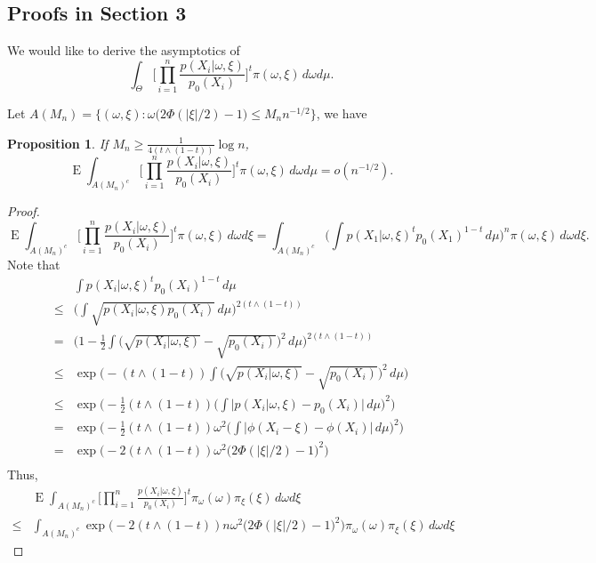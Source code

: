 \documentclass[11pt]{article}
\DeclareMathOperator{\myE}{E}
\theoremstyle{plain}
\newtheorem{proposition}{\quad\quad Proposition}
\theoremstyle{definition}
\theoremstyle{remark}
\begin{document}
\begin{appendices}
\section{Proofs in Section 3}

We would like to derive the asymptotics of
\begin{equation}
    \int_\Theta \Big[\prod_{i=1}^n \frac{p(X_i|\omega,\xi)}{p_0(X_i)}\Big]^t \pi(\omega,\xi)\, d\omega d\mu.
    \label{temp}
\end{equation}

Let $A(M_n)=\{(\omega, \xi): \omega \big( 2\Phi(|\xi|/2)-1\big)\leq M_n n^{-1/2}\}$, we have
\begin{proposition}
    If $M_n \geq  \frac{1}{4(t\wedge (1-t))}\log n$,
    \begin{equation*}
        \myE \int_{A(M_n)^c} \Big[\prod_{i=1}^n \frac{p(X_i|\omega,\xi)}{p_0(X_i)}\Big]^t \pi(\omega,\xi)\, d\omega d\mu =o(n^{-1/2}).
    \end{equation*}
\end{proposition}
\begin{proof}
\begin{equation*}
    \myE \int_{A(M_n)^c} \Big[\prod_{i=1}^n \frac{p(X_i|\omega,\xi)}{p_0(X_i)}\Big]^t \pi(\omega,\xi)\, d\omega d\xi
    =
    \int_{A(M_n)^c} \big( \int p(X_1|\omega,\xi)^t p_0(X_1)^{1-t}\, d\mu\big)^n \pi(\omega,\xi)\, d\omega d\xi.
\end{equation*}
Note that
\begin{align*}
    &\int p(X_i|\omega,\xi)^t p_0(X_i)^{1-t}\, d\mu
    \\
    \leq & \Big(\int \sqrt{p(X_i|\omega,\xi) p_0(X_i)}\, d\mu\Big)^{2(t\wedge (1-t))}
    \\
= & \Big(1-\frac{1}{2}\int \big(\sqrt{p(X_i|\omega,\xi) }-\sqrt{p_0(X_i)}\big)^2\, d\mu\Big)^{2(t\wedge (1-t))}
\\
\leq & \exp \Big( -(t\wedge (1-t))\int \big(\sqrt{p(X_i|\omega,\xi) }-\sqrt{p_0(X_i)}\big)^2\, d\mu \Big)
\\
\leq & \exp \Big( -\frac{1}{2}(t\wedge (1-t)) \big(\int \big| p(X_i|\omega,\xi)-p_0(X_i)\big|\, d\mu \big)^2 \Big)
\\
= & \exp \Big( -\frac{1}{2}(t\wedge (1-t)) \omega^2 \big(\int \big| \phi(X_i -\xi)-\phi (X_i)\big|\, d\mu \big)^2 \Big)
\\
= & \exp \Big( -2(t\wedge (1-t)) \omega^2 \big( 2\Phi(|\xi|/2)-1\big)^2 \Big)
\\
\end{align*}
Thus,
\begin{align*}
    &\myE \int_{A(M_n)^c} \Big[\prod_{i=1}^n \frac{p(X_i|\omega,\xi)}{p_0(X_i)}\Big]^t \pi_{\omega}(\omega)\pi_{\xi}(\xi)\, d\omega d\xi
\\
    \leq
    &
    \int_{A(M_n)^c} \exp \Big( -2(t\wedge (1-t)) n\omega^2 \big( 2\Phi(|\xi|/2)-1\big)^2 \Big)
\pi_{\omega}(\omega) \pi_\xi(\xi)\, d\omega d\xi
\end{align*}


\end{proof}
\end{appendices}
\end{document}
